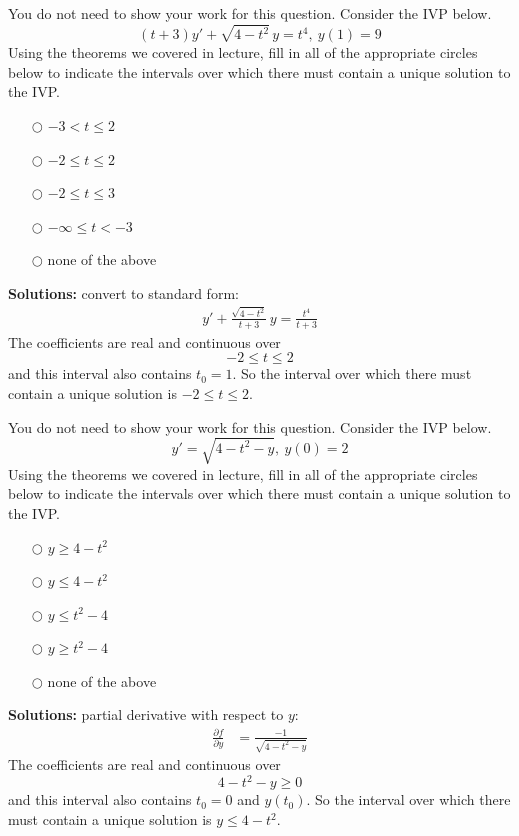 \ifnum {}
\question[1] You do not need to show your work for this question. Consider the IVP below.
$$\displaystyle (t+3)y' + \sqrt{4-t^2}\,y = t^4, \ y(1) = 9$$   
Using the theorems we covered in lecture, fill in all of the appropriate circles below to indicate the intervals over which there must contain a unique solution to the IVP. 
\begin{itemize}
    \item[$\bigcirc$] $-3 < t \le 2$
    \item[$\bigcirc$] $-2 \le t \le 2$
    \item[$\bigcirc$] $-2 \le t \le 3$    
    \item[$\bigcirc$] $-\infty \le t < -3$
    \item[$\bigcirc$] none of the above
\end{itemize}
\ifnum {} {\color{DarkBlue} 
\textbf{Solutions:} convert to standard form:
\begin{align}
    y' + \frac{\sqrt{4-t^2}}{t+3}\,y = \frac{t^4}{t+3}
\end{align}
The coefficients are real and continuous over $$-2\le t \le 2$$ and this interval also contains $t_0 = 1$. So the interval over which there must contain a unique solution is $-2\le t \le 2$. 
} 
\else 
\fi
\fi 



\ifnum {}
\question[1] You do not need to show your work for this question. Consider the IVP below.
$$\displaystyle y' = \sqrt{4-t^2-y}, \ y(0) = 2$$   
Using the theorems we covered in lecture, fill in all of the appropriate circles below to indicate the intervals over which there must contain a unique solution to the IVP. 
\begin{itemize}
    \item[$\bigcirc$] $y \ge 4-t^2$
    \item[$\bigcirc$] $y \le 4-t^2$
    \item[$\bigcirc$] $y \le t^2-4$
    \item[$\bigcirc$] $y \ge t^2-4$
    \item[$\bigcirc$] none of the above
\end{itemize}
\ifnum {} {\color{DarkBlue} 
\textbf{Solutions:} partial derivative with respect to $y$:
\begin{align}
    \frac{\partial f}{\partial y} &= \frac{-1}{\sqrt{4-t^2-y}}
\end{align}
The coefficients are real and continuous over $$4-t^2-y\ge 0$$ and this interval also contains $t_0 = 0$ and $y(t_0)$. So the interval over which there must contain a unique solution is $y \le 4-t^2$. 
} 
\else 
\fi
\fi 



